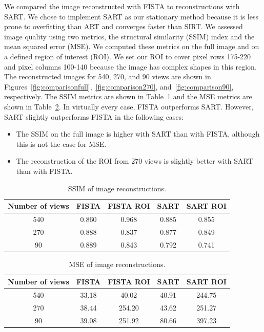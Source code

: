 \documentclass[12pt]{article}
\begin{document}
We compared the image reconstructed with FISTA to reconstructions with SART. We chose to implement SART as our stationary method because it is less prone to overfitting than ART and converges faster than SIRT. We assessed image quality using two metrics, the structural similarity (SSIM) index and the mean squared error (MSE). We computed these metrics on the full image and on a defined region of interest (ROI). We set our ROI to cover pixel rows 175-220 and pixel columns 100-140 because the image has complex shapes in this region. The reconstructed images for 540, 270, and 90 views are shown in Figures~\ref{fig:comparisonfull},~\ref{fig:comparison270}, and~\ref{fig:comparison90}, respectively. The SSIM metrics are shown in Table~\ref{tab:ssim} and the MSE metrics are shown in Table~\ref{tab:mse}. In virtually every case, FISTA outperforms SART. However, SART slightly outperforms FISTA in the following cases:
\begin{itemize}
	\item The SSIM on the full image is higher with SART than with FISTA, although this is not the case for MSE.
	\item The reconstruction of the ROI from 270 views is slightly better with SART than with FISTA.
\end{itemize}

\begin{table}[h]
	\centering
	\begin{tabular}{|c|c|c|c|c|}
		\hline
		\textbf{Number of views} & \textbf{FISTA} & \textbf{FISTA ROI} & \textbf{SART} & \textbf{SART ROI} \\
		\hline
		540 & 0.860 & 0.968 & 0.885 & 0.855 \\
		270 & 0.888 & 0.837 & 0.877 & 0.849 \\
		90  & 0.889 & 0.843 & 0.792 & 0.741 \\
		\hline
	\end{tabular}
	\caption{SSIM of image reconstructions.}
	\label{tab:ssim}
\end{table}

\begin{table}[h]
	\centering
	\begin{tabular}{|c|c|c|c|c|}
		\hline
		\textbf{Number of views} & \textbf{FISTA} & \textbf{FISTA ROI} & \textbf{SART} & \textbf{SART ROI} \\
		\hline
		540 & 33.18 &  40.02 & 40.91 & 244.75 \\
		270 & 38.44 & 254.20 & 43.62 & 251.27 \\
		90  & 39.08 & 251.92 & 80.66 & 397.23 \\
		\hline
	\end{tabular}
	\caption{MSE of image reconstructions.}
	\label{tab:mse}
\end{table}
\end{document}
